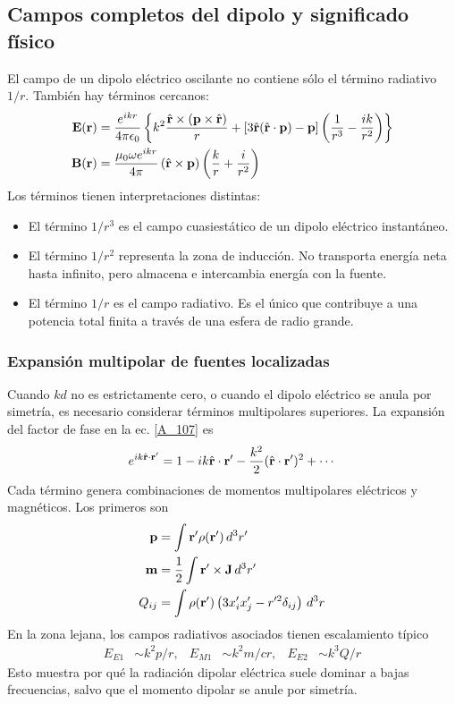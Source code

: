 \documentclass[]{article}
\numberwithin{equation}{section}
\begin{document}
\subsection{Campos completos del dipolo y significado físico}
El campo de un dipolo eléctrico oscilante no contiene sólo el término radiativo $1/r$. También hay términos cercanos:
\begin{align}
	\n{E}(\rv) &= \ke[e^{ikr}] \left\{k^2 \frac{\rhat \times (\n{p} \times \rhat)}{r} + \left[3\rhat (\rhat\cdot\n{p}) - \n{p}\right] \left(\frac{1}{r^3} - \frac{ik}{r^2}\right)\right\}\\
	\n{B}(\rv) &= \ku[\omega e^{ikr}] \left(\rhat\times\n{p}\right) \left(\frac{k}{r} + \frac{i}{r^2}\right)
\end{align}
Los términos tienen interpretaciones distintas:
\begin{itemize}
	\item El término $1/r^3$ es el campo cuasiestático de un dipolo eléctrico instantáneo.
	\item El término $1/r^2$ representa la zona de inducción. No transporta energía neta hasta infinito, pero almacena e intercambia energía con la fuente.
	\item El término $1/r$ es el campo radiativo. Es el único que contribuye a una potencia total finita a través de una esfera de radio grande.
\end{itemize}

\subsubsection{Expansión multipolar de fuentes localizadas}
Cuando $kd$ no es estrictamente cero, o cuando el dipolo eléctrico se anula por simetría, es necesario considerar términos multipolares superiores. La expansión del factor de fase en la ec. \ref{A_107} es
\begin{equation}
	e^{i k \hat{\mathbf{r}}\cdot\mathbf{r}'} = 1 - i k \hat{\mathbf{r}}\cdot\mathbf{r}' - \frac{k^2}{2} (\hat{\mathbf{r}}\cdot\mathbf{r}')^2 + \cdots
\end{equation}
Cada término genera combinaciones de momentos multipolares eléctricos y magnéticos. Los primeros son
\begin{align}
	\mathbf{p} &= \int\mathbf{r}' \rho(\mathbf{r}') \, d^3 r'\\
	\mathbf{m} &= \frac{1}{2}\int \mathbf{r}'\times\mathbf{J} \, d^3 r'\\
	Q_{ij} &= \int \rho(\mathbf{r}') \left(3x'_i x'_j - r'^2 \delta_{ij}\right) \, d^3 r
\end{align}
En la zona lejana, los campos radiativos asociados tienen escalamiento típico
\begin{align}
	E_{E1} &\sim k^2p/r, & E_{M1} &\sim k^2 m / c r, & E_{E2} &\sim k^3 Q/r
\end{align}
Esto muestra por qué la radiación dipolar eléctrica suele dominar a bajas frecuencias, salvo que el momento dipolar se anule por simetría.
\end{document}
